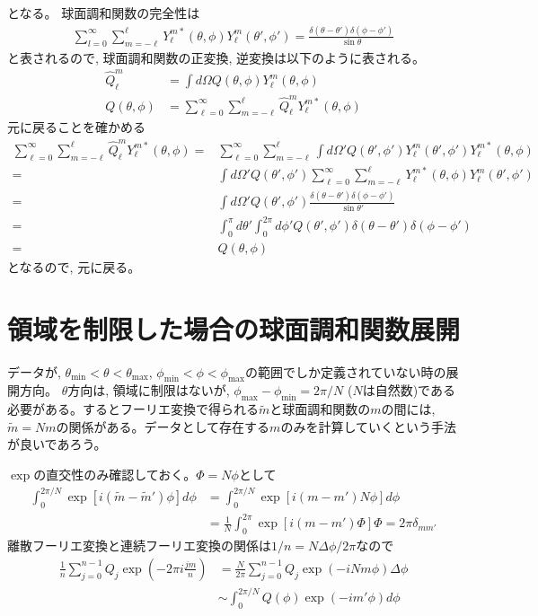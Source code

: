 \documentclass[a4j, 12pt]{ltjarticle}
\begin{document}
    となる。
    球面調和関数の完全性は
    \begin{align}
        \sum_{l=0}^{\infty} \sum_{m=-\ell}^{\ell} Y_\ell^{m*}(\theta,\phi)
        Y_\ell^m(\theta',\phi') = \frac{\delta(\theta - \theta')\delta(\phi - \phi')}{\sin\theta}
    \end{align}
    と表されるので, 球面調和関数の正変換, 逆変換は以下のように表される。
    \begin{align}
        \widehat{Q}_\ell^m &= 
        \int d\Omega Q(\theta,\phi) Y_\ell^m(\theta,\phi) \\
        Q(\theta,\phi) &= \sum_{\ell=0}^\infty \sum_{m=-\ell}^\ell \widehat{Q}_\ell^m 
        Y_\ell^{m*}(\theta,\phi)
    \end{align}
    元に戻ることを確かめる
    \begin{align}
        \sum_{\ell=0}^\infty \sum_{m=-\ell}^\ell \widehat{Q}_\ell^m 
        Y_\ell^{m*}(\theta,\phi) =&
        \sum_{\ell=0}^\infty \sum_{m=-\ell}^\ell  \int d\Omega' Q(\theta',\phi') Y_\ell^m(\theta',\phi')
        Y_\ell^{m*}(\theta,\phi) \\
        =& \int d\Omega' Q(\theta',\phi') \sum_{\ell=0}^\infty
        \sum_{m=-\ell}^\ell  Y_\ell^{m*}(\theta,\phi)
        Y_\ell^m(\theta',\phi') \\
        =& \int d\Omega' Q(\theta',\phi')\frac{\delta(\theta-\theta')\delta(\phi-\phi')}{\sin\theta'} \\
        =& \int_0^\pi d\theta' \int_0^{2\pi} d\phi'Q(\theta',\phi')\delta(\theta-\theta')\delta(\phi-\phi') \\
        =& Q(\theta,\phi)
    \end{align}
    となるので, 元に戻る。
    \section{領域を制限した場合の球面調和関数展開}
    データが, $\theta_\mathrm{min}<\theta<\theta_\mathrm{max}$, $\phi_\mathrm{min}<\phi<\phi_\mathrm{max}$の範囲でしか定義されていない時の展開方向。
    $\theta$方向は, 領域に制限はないが, $\phi_\mathrm{max}-\phi_\mathrm{min}=2\pi/N$ ($N$は自然数)である必要がある。するとフーリエ変換で得られる$\tilde{m}$と球面調和関数の$m$の間には, $\tilde{m}=Nm$の関係がある。データとして存在する$m$のみを計算していくという手法が良いであろう。\par
    $\exp$の直交性のみ確認しておく。$\Phi = N\phi$として
    \begin{align}
        \int_0^{2\pi/N} \exp[i(\tilde{m}-\tilde{m}')\phi]d\phi
        &= \int_0^{2\pi/N} \exp[i(m-m')N\phi]d\phi \\
        &= \frac{1}{N}\int_0^{2\pi} \exp[i(m-m')\Phi] \Phi = 2\pi \delta_{mm'}        
    \end{align}
    離散フーリエ変換と連続フーリエ変換の関係は$1/n=N\Delta \phi/2\pi$なので
    \begin{align}
        \frac{1}{n}\sum_{j=0}^{n-1}Q_j \exp\left(-2\pi i \frac{jm}{n}\right)
        &= \frac{N}{2\pi}\sum_{j=0}^{n-1}Q_j\exp\left(-iNm\phi \right) \Delta \phi \\
        &\sim \int_0^{2\pi/N} Q(\phi) \exp(-im'\phi)d\phi
    \end{align}    
    \appendix
\end{document}
